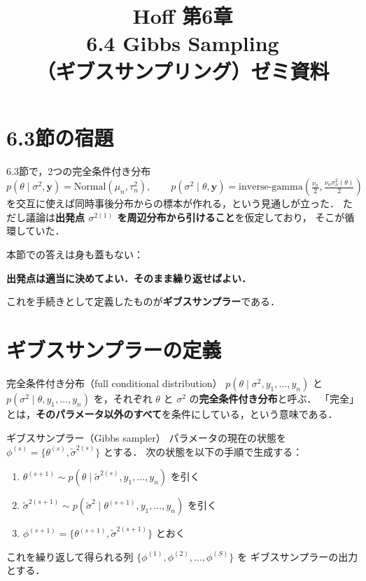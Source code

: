 \documentclass[lualatex,ja=standard,a4paper,12pt]{bxjsarticle}
\title{{\large Hoff 第6章} \\[6pt]
       \textbf{6.4\; Gibbs Sampling} \\[4pt]
       {\normalsize （ギブスサンプリング）ゼミ資料}}
\author{}
\date{}
\begin{document}
\maketitle
\thispagestyle{empty}

\section{6.3節の宿題}

6.3節で，2つの完全条件付き分布
\[
  p(\theta \mid \sigma^2, \boldsymbol{y}) = \mathrm{Normal}(\mu_n, \tau_n^2),
  \qquad
  p(\sigma^2 \mid \theta, \boldsymbol{y}) = \mathrm{inverse\text{-}gamma}\!\left(\tfrac{\nu_n}{2}, \tfrac{\nu_n\sigma_n^2(\theta)}{2}\right)
\]
を交互に使えば同時事後分布からの標本が作れる，という見通しが立った．
ただし議論は\textbf{出発点 $\sigma^{2(1)}$ を周辺分布から引けること}を仮定しており，
そこが循環していた．

\medskip
本節での答えは身も蓋もない：
\begin{center}
\textbf{出発点は適当に決めてよい．そのまま繰り返せばよい．}
\end{center}

\noindent これを手続きとして定義したものが\textbf{ギブスサンプラー}である．

\section{ギブスサンプラーの定義}

\begin{defbox}{完全条件付き分布（full conditional distribution）}
$p(\theta \mid \sigma^2, y_1, \ldots, y_n)$ と
$p(\sigma^2 \mid \theta, y_1, \ldots, y_n)$ を，それぞれ
$\theta$ と $\sigma^2$ の\textbf{完全条件付き分布}と呼ぶ．
「完全」とは，\textbf{そのパラメータ以外のすべて}を条件にしている，という意味である．
\end{defbox}

\begin{defbox}{ギブスサンプラー（Gibbs sampler）}
パラメータの現在の状態を
$\phi^{(s)} = \{\theta^{(s)}, \tilde{\sigma}^{2(s)}\}$ とする．
次の状態を以下の手順で生成する：
\begin{enumerate}
  \item $\theta^{(s+1)} \sim p(\theta \mid \tilde{\sigma}^{2(s)}, y_1, \ldots, y_n)$ を引く
  \item $\tilde{\sigma}^{2(s+1)} \sim p(\tilde{\sigma}^2 \mid \theta^{(s+1)}, y_1, \ldots, y_n)$ を引く
  \item $\phi^{(s+1)} = \{\theta^{(s+1)}, \tilde{\sigma}^{2(s+1)}\}$ とおく
\end{enumerate}
これを繰り返して得られる列
$\{\phi^{(1)}, \phi^{(2)}, \ldots, \phi^{(S)}\}$ を
ギブスサンプラーの出力とする．
\end{defbox}
\end{document}
